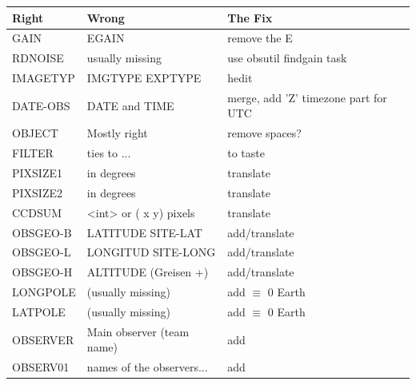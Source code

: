 \documentclass[letter,11pt,oneside]{article}
\begin{document}
\begin{table}[h!]
\centering
\begin{tabular}{ l  l l}
\hline
Right      & Wrong                                          & The Fix  \\
\hline
GAIN       & EGAIN                                          & remove the E \\
RDNOISE    & usually missing                                & use obsutil findgain task \\
IMAGETYP   & IMGTYPE  EXPTYPE                               & hedit   \\
DATE-OBS   & DATE and TIME                                  & merge, add 'Z' timezone part for UTC \\
OBJECT     & Mostly right                                   & remove spaces?   \\
FILTER     & ties to {\color{verbcolor}{\verb#ccdred$#}}... & to taste   \\
\hline
PIXSIZE1   & in degrees                                     & translate \\
PIXSIZE2   & in degrees                                     & translate  \\
CCDSUM     & <int> or ( x   y)  pixels                      & translate \\
\hline
OBSGEO-B   & LATITUDE SITE-LAT                              & add/translate \\
OBSGEO-L   & LONGITUD SITE-LONG                             & add/translate \\
OBSGEO-H   & ALTITUDE  (Greisen  +)                         & add/translate \\
LONGPOLE   & (usually missing)                              & add $\equiv$ 0 Earth \\
LATPOLE    & (usually missing)                              & add $\equiv$ 0 Earth\\
\hline
OBSERVER   & Main observer (team name)                      & add \\
OBSERV01   & names of the observers...                      & add \\

\end{tabular}
\end{table}
\end{document}
